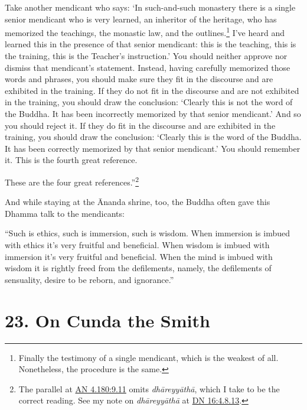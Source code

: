\documentclass[12pt,openany]{book}%
\begin{document}
Take another mendicant who says: ‘In such-and-such monastery there is a single senior mendicant who is very learned, an inheritor of the heritage, who has memorized the teachings, the monastic law, and the outlines.\footnote{Finally the testimony of a single mendicant, which is the weakest of all. Nonetheless, the procedure is the same. } I’ve heard and learned this in the presence of that senior mendicant: this is the teaching, this is the training, this is the Teacher’s instruction.’ You should neither approve nor dismiss that mendicant’s statement. Instead, having carefully memorized those words and phrases, you should make sure they fit in the discourse and are exhibited in the training. If they do not fit in the discourse and are not exhibited in the training, you should draw the conclusion: ‘Clearly this is not the word of the Buddha. It has been incorrectly memorized by that senior mendicant.’ And so you should reject it. If they do fit in the discourse and are exhibited in the training, you should draw the conclusion: ‘Clearly this is the word of the Buddha. It has been correctly memorized by that senior mendicant.’ You should remember it. This is the fourth great reference. 

These are the four great references.”\footnote{The parallel at \href{https://suttacentral.net/an4.180/en/sujato\#9.11}{AN 4.180:9.11} omits \textit{\textsanskrit{dhāreyyāthā}}, which I take to be the correct reading. See my note on \textit{\textsanskrit{dhāreyyāthā}} at \href{https://suttacentral.net/dn16/en/sujato\#4.8.13}{DN 16:4.8.13}. } 

And while staying at the Ānanda shrine, too, the Buddha often gave this Dhamma talk to the mendicants: 

“Such is ethics, such is immersion, such is wisdom. When immersion is imbued with ethics it’s very fruitful and beneficial. When wisdom is imbued with immersion it’s very fruitful and beneficial. When the mind is imbued with wisdom it is rightly freed from the defilements, namely, the defilements of sensuality, desire to be reborn, and ignorance.” 

\section*{23. On Cunda the Smith }
\end{document}
